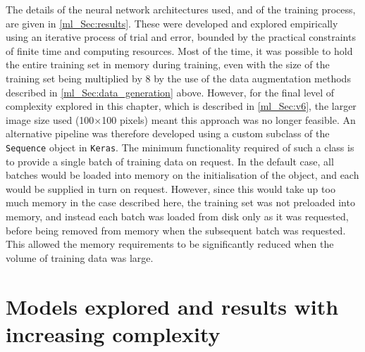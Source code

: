 The details of the neural network architectures used, and of the training process, are given in \autoref{ml_Sec:results}. These were developed and explored empirically using an iterative process of trial and error, bounded by the practical constraints of finite time and computing resources. Most of the time, it was possible to hold the entire training set in memory during training, even with the size of the training set being multiplied by 8 by the use of the data augmentation methods described in \autoref{ml_Sec:data_generation} above. However, for the final level of complexity explored in this chapter, which is described in \autoref{ml_Sec:v6}, the larger image size used (100$\times$100 pixels) meant this approach was no longer feasible. An alternative pipeline was therefore developed using a custom subclass of the \texttt{Sequence} object in \texttt{Keras}. The minimum functionality required of such a class is to provide a single batch of training data on request. In the default case, all batches would be loaded into memory on the initialisation of the object, and each would be supplied in turn on request. However, since this would take up too much memory in the case described here, the training set was not preloaded into memory, and instead each batch was loaded from disk only as it was requested, before being removed from memory when the subsequent batch was requested. This allowed the memory requirements to be significantly reduced when the volume of training data was large.

\section{Models explored and results with increasing complexity}
\label{ml_Sec:results}

